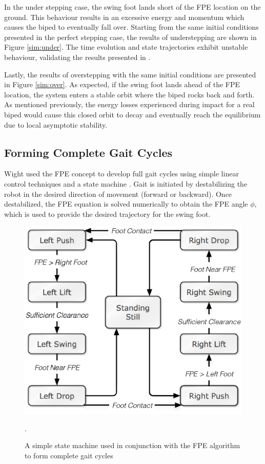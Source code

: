 In the under stepping case, the swing foot lands short of the FPE location on the ground. This behaviour results in an excessive energy and momentum which causes the biped to eventually fall over. Starting from the same initial conditions presented in the perfect stepping case, the results of understepping are shown in Figure \ref{sim:under}. The time evolution and state trajectories exhibit unstable behaviour,  validating the results presented in \cite{Wight:2008ii}. 

Lastly, the results of overstepping with the same initial conditions are presented in Figure \ref{sim:over}. As expected, if the swing foot lands ahead of the FPE location, the system enters a stable orbit where the biped rocks back and forth. As mentioned previously, the energy losses experienced during impact for a real biped would cause this closed orbit to decay and eventually reach the equilibrium due to local asymptotic stability. 


\subsection{Forming Complete Gait Cycles} %
\label{sub:gait_cycles}
Wight used the FPE concept to develop full gait cycles using simple linear control techniques and a state machine \cite{Wight:2008vt}. Gait is initiated by destabilizing the robot in the desired direction of movement (forward or backward). Once destabilized, the FPE equation is solved numerically to obtain the FPE angle $\phi$, which is used to provide the desired trajectory for the swing foot. 

\begin{figure}[!h]
	\centering
    \includegraphics[scale=0.8]{fig/fpe/statemachine.eps}
  	\caption{A simple state machine used in conjunction with the FPE algorithm to form complete gait cycles}.
	\label{fig:statemachine}
\end{figure}

